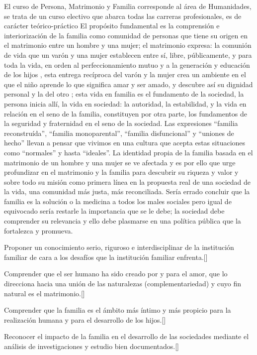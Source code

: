 \begin{syllabus}


\begin{justification}
El curso de Persona, Matrimonio y Familia corresponde al área de Humanidades, se trata de un curso electivo que abarca todas las carreras profesionales, es de carácter teórico-práctico El propósito fundamental es la comprensión e interiorización  de la familia como  comunidad de personas que tiene su origen en el matrimonio entre un hombre y una mujer; el matrimonio expresa: la comunión de vida que un varón y una mujer establecen entre sí, libre, públicamente, y para toda la vida, en orden al perfeccionamiento mutuo y a la generación y educación de los hijos , esta entrega recíproca del varón y la mujer crea  un ambiente en el que el niño aprende lo que significa amar y ser amado, y descubre así su dignidad personal y la del otro ; esta vida en familia es el fundamento de la sociedad, la persona inicia allí, la vida en sociedad: la autoridad, la estabilidad, y la vida en relación en el seno de la familia, constituyen por otra parte, los fundamentos de la seguridad y fraternidad en el seno de la sociedad.
Las expresiones ``familia reconstruída'', ``familia monoparental'', ``familia disfuncional'' y ``uniones de hecho'' llevan a pensar que vivimos en una cultura que acepta estas situaciones como ``normales'' y hasta ``ideales''. La identidad propia de la familia basada en el matrimonio de un hombre y una mujer se ve afectada y es por ello que urge profundizar en el matrimonio y la familia para descubrir su riqueza y valor y sobre todo su misión como primera línea en la propuesta real de una sociedad de la vida, una comunidad más justa, más reconciliada. Sería errado concluir que la familia es la solución o la medicina a todos los males sociales pero igual de equivocado sería restarle la importancia que se le debe; la sociedad debe comprender su relevancia y ello debe plasmarse en una política pública que la fortalezca y promueva. 
\end{justification}

\begin{goals}
	\item Proponer un conocimiento serio, riguroso e interdisciplinar de la institución familiar de cara a los desafíos que la institución familiar enfrenta.[\Usage]
	\item Comprender que el ser humano ha sido creado por y para el amor, que lo direcciona hacia una unión de las naturalezas (complementariedad) y cuyo fin natural es el matrimonio.[\Familiarity]
	\item Comprender que la familia es el ámbito más íntimo y más propicio para la realización humana y para el desarrollo de los hijos.[\Familiarity]
	\item Reconocer el impacto de la familia en el desarrollo de las sociedades mediante el análisis de investigaciones y estudio bien documentados.[\Familiarity]
\end{goals}


\end{syllabus}
